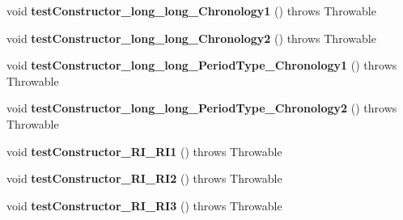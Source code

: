 \begin{DoxyCompactItemize}
\item 
\hypertarget{classorg_1_1joda_1_1time_1_1_test_period___constructors_a09109f47978194b1f504ef279d5f7c15}{void {\bfseries test\-Constructor\-\_\-long\-\_\-long\-\_\-\-Chronology1} ()  throws Throwable }\label{classorg_1_1joda_1_1time_1_1_test_period___constructors_a09109f47978194b1f504ef279d5f7c15}

\item 
\hypertarget{classorg_1_1joda_1_1time_1_1_test_period___constructors_a9d9da0f6171c48b43e2a7f348ec092d7}{void {\bfseries test\-Constructor\-\_\-long\-\_\-long\-\_\-\-Chronology2} ()  throws Throwable }\label{classorg_1_1joda_1_1time_1_1_test_period___constructors_a9d9da0f6171c48b43e2a7f348ec092d7}

\item 
\hypertarget{classorg_1_1joda_1_1time_1_1_test_period___constructors_abd81c738f8f7b053e81a4cda308335fb}{void {\bfseries test\-Constructor\-\_\-long\-\_\-long\-\_\-\-Period\-Type\-\_\-\-Chronology1} ()  throws Throwable }\label{classorg_1_1joda_1_1time_1_1_test_period___constructors_abd81c738f8f7b053e81a4cda308335fb}

\item 
\hypertarget{classorg_1_1joda_1_1time_1_1_test_period___constructors_a3a9b771b076caafefcbb51004091c576}{void {\bfseries test\-Constructor\-\_\-long\-\_\-long\-\_\-\-Period\-Type\-\_\-\-Chronology2} ()  throws Throwable }\label{classorg_1_1joda_1_1time_1_1_test_period___constructors_a3a9b771b076caafefcbb51004091c576}

\item 
\hypertarget{classorg_1_1joda_1_1time_1_1_test_period___constructors_aa57e77476607000e57d666372d89305c}{void {\bfseries test\-Constructor\-\_\-\-R\-I\-\_\-\-R\-I1} ()  throws Throwable }\label{classorg_1_1joda_1_1time_1_1_test_period___constructors_aa57e77476607000e57d666372d89305c}

\item 
\hypertarget{classorg_1_1joda_1_1time_1_1_test_period___constructors_a4743930d9a3a2d208082e16609404aa7}{void {\bfseries test\-Constructor\-\_\-\-R\-I\-\_\-\-R\-I2} ()  throws Throwable }\label{classorg_1_1joda_1_1time_1_1_test_period___constructors_a4743930d9a3a2d208082e16609404aa7}

\item 
\hypertarget{classorg_1_1joda_1_1time_1_1_test_period___constructors_a579241a411ef2e10a4c6dcf0340b8afa}{void {\bfseries test\-Constructor\-\_\-\-R\-I\-\_\-\-R\-I3} ()  throws Throwable }\label{classorg_1_1joda_1_1time_1_1_test_period___constructors_a579241a411ef2e10a4c6dcf0340b8afa}


\end{DoxyCompactItemize}
